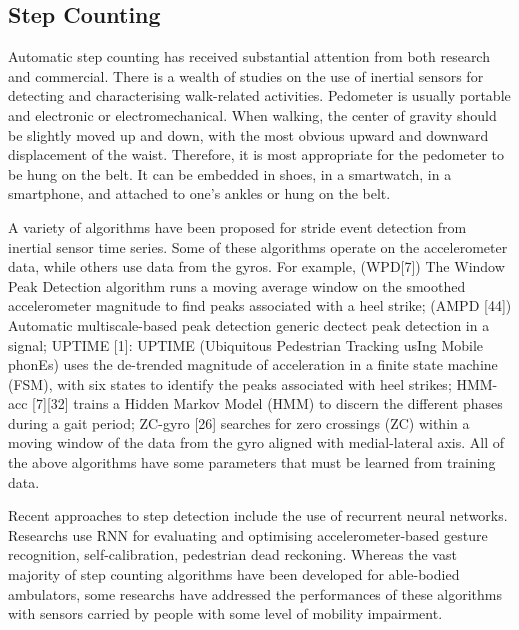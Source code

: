 \documentclass[11pt]{article}
\begin{document}
\subsection{Step Counting}

Automatic step counting has received substantial attention from both  research and commercial. There is a wealth of studies on the use of inertial sensors for detecting and characterising walk-related activities. Pedometer is usually portable and electronic or electromechanical. When walking, the center of gravity should be slightly moved up and down, with the most obvious upward and downward displacement of the waist. Therefore, it is most appropriate for the pedometer to be hung on the belt. It can be embedded in shoes, in a smartwatch, in a smartphone, and attached to one’s ankles or hung on the belt. 

A variety of algorithms have been proposed for stride event detection from inertial sensor time series. Some of these algorithms operate on the accelerometer data, while others use data from the gyros. For example, (WPD[7]) The Window Peak Detection algorithm runs a moving average window on the smoothed accelerometer magnitude to find peaks associated with a heel strike; (AMPD [44]) Automatic multiscale-based peak detection generic dectect peak detection in a signal; UPTIME [1]: UPTIME (Ubiquitous Pedestrian Tracking usIng Mobile phonEs) uses the de-trended magnitude of acceleration in a finite state machine (FSM), with six states to identify the peaks associated with heel strikes; HMM-acc [7][32] trains a Hidden Markov Model (HMM) to discern the different phases during a gait period; ZC-gyro [26] searches for zero crossings (ZC) within a moving window of the data from the gyro aligned with medial-lateral axis. All of the above algorithms have some parameters that must be learned from training data.

Recent approaches to step detection include the use of recurrent neural networks. Researchs use RNN for evaluating and optimising accelerometer-based gesture recognition, self-calibration, pedestrian dead reckoning. Whereas the vast majority of step counting algorithms have been developed for able-bodied ambulators, some researchs have addressed the performances of these algorithms with sensors carried by people with some level of mobility impairment. 
\end{document}
